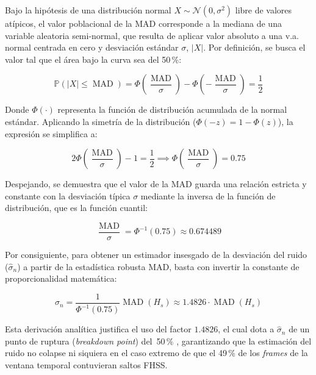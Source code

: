 Bajo la hipótesis de una distribución normal $X \sim \mathcal{N}(0, \sigma^2)$ libre de valores atípicos, el valor poblacional de la MAD corresponde a la mediana de una variable aleatoria semi-normal, que resulta de aplicar valor absoluto a una v.a. normal centrada en cero y desviación estándar $\sigma$, $|X|$. Por definición, se busca el valor tal que el área bajo la curva sea del 50\,\%:

\begin{equation}
    \mathbb{P}(|X| \le \operatorname{MAD}) = \Phi\left(\frac{\operatorname{MAD}}{\sigma}\right) - \Phi\left(-\frac{\operatorname{MAD}}{\sigma}\right) = \frac{1}{2}
\end{equation}

Donde $\Phi(\cdot)$ representa la función de distribución acumulada de la normal estándar. Aplicando la simetría de la distribución ($\Phi(-z) = 1 - \Phi(z)$), la expresión se simplifica a:

\begin{equation}
    2\Phi\left(\frac{\operatorname{MAD}}{\sigma}\right) - 1 = \frac{1}{2} \implies \Phi\left(\frac{\operatorname{MAD}}{\sigma}\right) = 0.75
\end{equation}

Despejando, se demuestra que el valor de la MAD guarda una relación estricta y constante con la desviación típica $\sigma$ mediante la inversa de la función de distribución, que es la función cuantil:

\begin{equation}
    \frac{\operatorname{MAD}}{\sigma} = \Phi^{-1}(0.75) \approx 0.674489
\end{equation}

Por consiguiente, para obtener un estimador insesgado de la desviación del ruido ($\hat{\sigma}_n$) a partir de la estadística robusta MAD, basta con invertir la constante de proporcionalidad matemática:

\begin{equation}
    \hat{\sigma}_n = \frac{1}{\Phi^{-1}(0.75)} \operatorname{MAD}(H_s) \approx 1.4826 \cdot \operatorname{MAD}(H_s)
    \label{eq:mad_escala}
\end{equation}

Esta derivación analítica justifica el uso del factor $1.4826$, el cual dota a $\hat{\sigma}_n$ de un punto de ruptura (\textit{breakdown point}) del~50\,\% \cite{hampel_robust_1986}, garantizando que la estimación del ruido no colapse ni siquiera en el caso extremo de que el 49\,\% de los \textit{frames} de la ventana temporal contuvieran saltos FHSS.

